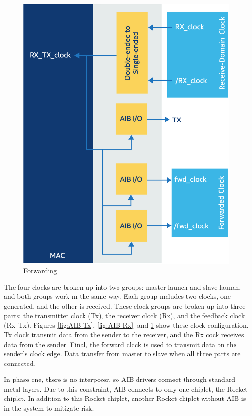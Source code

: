 \documentclass[../main.tex]{subfiles}
\begin{document}
\begin{figure}
    \centering
    \includegraphics[scale=.2]{pngs/AIB-Rx-Tx.png}
    \caption{Forwarding\cite{AIBWhitePaper}}
    \label{fig:AIB-Rx-Tx}
\end{figure}


The four clocks are broken up into two groups: master launch and slave launch, and both groups work in the same way. Each group includes two clocks, one generated, and the other is received. These clock groups are broken up into three parts: the transmitter clock (Tx), the receiver clock (Rx), and the feedback clock (Rx\texttt{\_}Tx). Figures \ref{fig:AIB-Tx}, \ref{fig:AIB-Rx}, and \ref{fig:AIB-Rx-Tx} show these clock configuration. Tx clock transmit data from the sender to the receiver, and the Rx cock receives data from the sender. Final, the forward clock is used to transmit data on the sender's clock edge. Data transfer from master to slave when all three parts are connected.

In phase one, there is no interposer, so AIB drivers connect through standard metal layers. Due to this constraint, AIB connects to only one chiplet, the Rocket chiplet. In addition to this Rocket chiplet, another Rocket chiplet without AIB is in the system to mitigate risk. 
\end{document}
